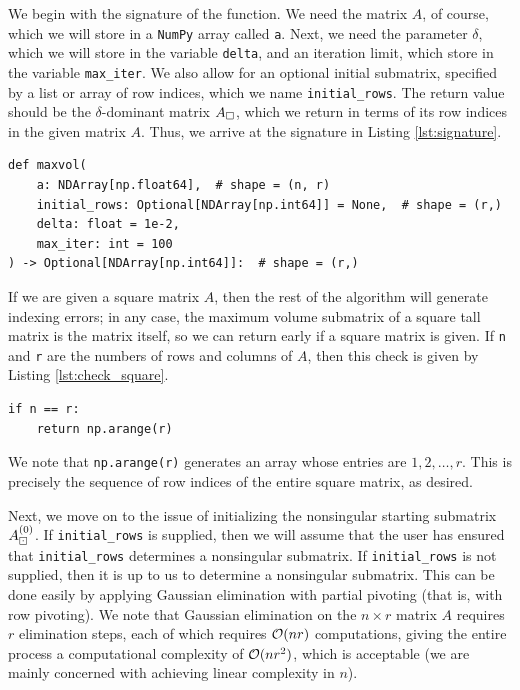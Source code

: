 \documentclass{article}
\begin{document}
	\newcommand{\va}{\texttt{a}}
	\newcommand{\vinitialrows}{\texttt{initial\_rows}}
	\newcommand{\vdelta}{\texttt{delta}}
	\newcommand{\vmaxiter}{\texttt{max\_iter}}
	
	
	We begin with the signature of the \maxvol{} function. We need the matrix $A$, of course, which we will store in a \texttt{NumPy} array called \va. Next, we need the parameter $\delta$, which we will store in the variable \vdelta, and an iteration limit, which store in the variable \vmaxiter. We also allow for an optional initial submatrix, specified by a list or array of row indices, which we name \vinitialrows. The return value should be the $\delta$-dominant matrix $A_\square$, which we return in terms of its row indices in the given matrix $A$. Thus, we arrive at the signature in Listing \ref{lst:signature}.
	\begin{lstlisting}[caption={function signature}, label=lst:signature]
def maxvol(
    a: NDArray[np.float64],  # shape = (n, r)
    initial_rows: Optional[NDArray[np.int64]] = None,  # shape = (r,)
    delta: float = 1e-2,
    max_iter: int = 100
) -> Optional[NDArray[np.int64]]:  # shape = (r,)
	\end{lstlisting}
	
	If we are given a square matrix $A$, then the rest of the algorithm will generate indexing errors; in any case, the maximum volume submatrix of a square tall matrix is the matrix itself, so we can return early if a square matrix is given. If \texttt{n} and \texttt{r} are the numbers of rows and columns of $A$, then this check is given by Listing \ref{lst:check_square}.
	\begin{lstlisting}[caption={square matrix check}, label=lst:check_square]
if n == r:
    return np.arange(r)
	\end{lstlisting}
	We note that \texttt{np.arange(r)} generates an array whose entries are $1,2,\dots, r$. This is precisely the sequence of row indices of the entire square matrix, as desired.
	
	
	Next, we move on to the issue of initializing the nonsingular starting submatrix $A_\boxdot^{(0)}$. If \vinitialrows{} is supplied, then we will assume that the user has ensured that \vinitialrows{}  determines a nonsingular submatrix. If \vinitialrows{} is not supplied, then it is up to us to determine a nonsingular submatrix. This can be done easily by applying Gaussian elimination with partial pivoting (that is, with row pivoting). We note that Gaussian elimination on the $n\times r$ matrix $A$ requires $r$ elimination steps, each of which requires $\mathcal{O}(nr)$ computations, giving the entire process a computational complexity of $\mathcal{O}(nr^2)$, which is acceptable (we are mainly concerned with achieving linear complexity in $n$).
	
\end{document}
